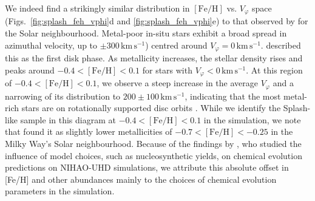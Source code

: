 \documentclass[fleqn,usenatbib]{mnras}
\begin{document}
We indeed find a strikingly similar distribution in $\mathrm{[Fe/H]}$ vs. $V_\varphi$ space (Figs.~\ref{fig:splash_feh_vphi}d and \ref{fig:splash_feh_vphi}e) to that observed by \citet{Belokurov2020} for the Solar neighbourhood. Metal-poor in-situ stars exhibit a broad spread in azimuthal velocity, up to $\pm 300\,\mathrm{km\,s^{-1}}$) centred around $V_\varphi = 0\,\mathrm{km\,s^{-1}}$. \citet{Chandra2024} described this as the first disk phase. As metallicity increases, the stellar density rises and peaks around $-0.4 < \mathrm{[Fe/H]} < 0.1$ for stars with $V_\varphi < 0\,\mathrm{km\,s^{-1}}$. At this region of $-0.4 < \mathrm{[Fe/H]} < 0.1$, we observe a steep increase in the average $V_\varphi$ \citep[the second phase according to][]{Chandra2024} and a narrowing of its distribution to $200 \pm 100\,\mathrm{km\,s^{-1}}$, indicating that the most metal-rich stars are on rotationally supported disc orbits \citep[the third phase in][]{Chandra2024}. While we identify the Splash-like sample in this diagram at $-0.4 < \mathrm{[Fe/H]} < 0.1$ in the simulation, we note that \citet{Belokurov2020} found it as slightly lower metallicities of $-0.7 < \mathrm{[Fe/H]} < -0.25$ in the Milky Way's Solar neighbourhood. Because of the findings by \citet{Buck2021}, who studied the influence of model choices, such as nucleosynthetic yields, on chemical evolution predictions on NIHAO-UHD simulations, we attribute this absolute offset in [Fe/H] and other abundances mainly to the choices of chemical evolution parameters in the simulation.
\end{document}
